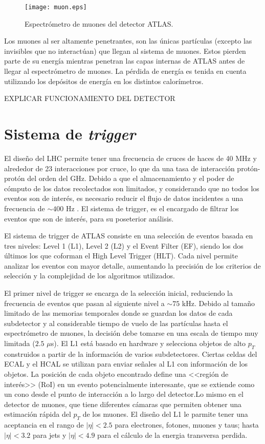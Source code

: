 \begin{figure}
\centering
\texttt{[image: muon.eps]}
\caption{Espectrómetro de muones del detector ATLAS.}
\label{muon}
\end{figure}

Los muones al ser altamente penetrantes, son las únicas partículas (excepto las invisibles que no interactúan) que llegan al sistema de muones. Estos pierden parte de su energía mientras penetran las capas internas de ATLAS antes de llegar al espectrómetro de muones. La pérdida de energía es tenida en cuenta utilizando los depósitos de energía en los distintos calorímetros.

EXPLICAR FUNCIONAMIENTO DEL DETECTOR

\section{Sistema de \textit{trigger}}

El diseño del LHC permite tener una frecuencia de cruces de haces de 40 MHz y alrededor de 23 interacciones por cruce, lo que da una tasa de interacción protón-protón del orden del GHz. Debido a que el almacenamiento y el poder de cómputo de los datos recolectados son limitados, y considerando que no todos los eventos son de interés, es necesario reducir el flujo de datos incidentes a una frecuencia de $\sim 400$ Hz \cite{PERF-2011-02}. El sistema de trigger, es el encargado de filtrar los eventos que son de interés, para su poseterior análisis. 

El sistema de trigger de ATLAS consiste en una selección de eventos basada en tres niveles: Level 1 (L1), Level 2 (L2) y el Event Filter (EF), siendo los dos últimos los que coforman el High Level Trigger (HLT). Cada nivel permite analizar los eventos con mayor detalle, aumentando la precisión de los criterios de selección y la complejidad de los algoritmos utilizados.

El primer nivel de trigger se encarga de la selección inicial, reduciendo la frecuencia de eventos que pasan al siguiente nivel a $\sim 75$ kHz. Debido al tamaño limitado de las memorias temporales donde se guardan los datos de cada subdetector y al considerable tiempo de vuelo de las partículas hasta el espectrómetro de muones, la decisión debe tomarse en una escala de tiempo muy limitada ($2.5$ $\mu$s). El L1 está basado en hardware y selecciona objetos de alto $p_{T}$ construidos a partir de la información de varios subdetectores. Ciertas celdas del ECAL y el HCAL se utilizan para enviar señales al L1 con información de los objetos. La posición de cada objeto encontrado define una <<región de interés>> (RoI) en un evento potencialmente interesante, que se extiende como un
cono desde el punto de interacción a lo largo del detector.Lo mismo en el detector de muones, que tiene diferentes cámaras que permiten obtener una estimación rápida del $p_{T}$ de los muones. El diseño del L1 le parmite tener una aceptancia en el rango de $|\eta|<2.5$ para electrones, fotones, muones y taus; hasta $|\eta|<3.2$ para jets y $|\eta|<4.9$ para el cálculo de la energia transversa perdida.

